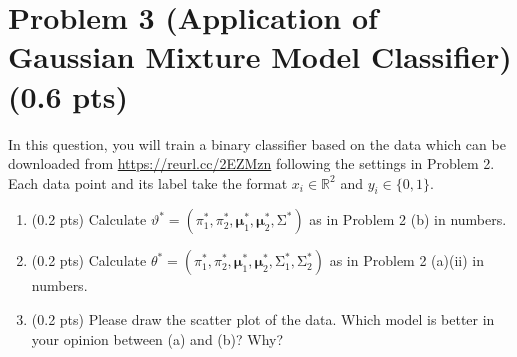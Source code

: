 \documentclass{article}
\newcommand{\real}{\mathbb{R}}
\def\vecmu{{\boldsymbol \mu}}
\def\matSigma{{\mathbf{\mathrm{\Sigma}}}}
\def\real{{\mathbb {R}}}
\begin{document}
\section*{Problem 3 (Application of Gaussian Mixture Model Classifier) (0.6 pts)}
In this question, you will train a binary classifier based on the data which can be downloaded from \href{https://reurl.cc/2EZMzn}{https://reurl.cc/2EZMzn}  following the settings in Problem 2. Each data point and its label take the format $x_i \in \real^2$ and $y_i \in \{0,1\}$. 
\begin{enumerate}[label=(\alph*)]
    \item (0.2 pts) Calculate $\vartheta^* = (\pi^*_1,\pi^*_2,\vecmu^*_1,\vecmu^*_2,\matSigma^*)$ as in Problem 2 (b) in numbers.
    \item (0.2 pts) Calculate $\theta^* = (\pi^*_1,\pi^*_2,\vecmu^*_1,\vecmu^*_2,\matSigma^*_1,\matSigma^*_2)$ as in Problem 2 (a)(ii) in numbers.
    \item (0.2 pts) Please draw the scatter plot of the data. Which model is better in your opinion between (a) and (b)? Why?
\end{enumerate}
 
\end{document}
